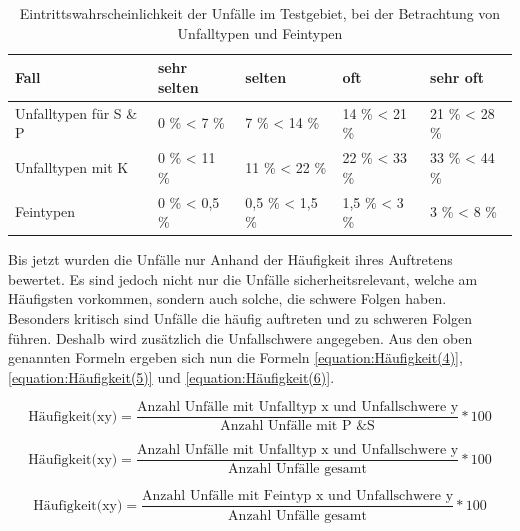 \begin{table}[htpb]
	\scriptsize
	\caption[Eintrittswahrscheinlichkeit der Unfälle im Testgebiet, bei der Betrachtung von Unfalltypen und Feintypen]{Eintrittswahrscheinlichkeit der Unfälle im Testgebiet, bei der Betrachtung von Unfalltypen und Feintypen}\label{tab:Haeufigkeits Bereiche}
	\centering
		\begin{tabular}{p{2cm} l l l l}
			\toprule
			Fall & sehr selten & selten & oft & sehr oft \\
			\midrule
			Unfalltypen für S \& P & 0 \% < 7 \%  & 7 \% < 14 \% & 14 \% < 21 \% & 21 \% < 28 \%\\
			Unfalltypen mit K & 0 \% < 11 \%  & 11 \% < 22 \% & 22 \% < 33 \% & 33 \% < 44 \%\\
			Feintypen & 0 \% < 0,5 \% & 0,5 \% < 1,5 \% & 1,5 \% < 3 \% & 3 \% < 8 \%\\
			\bottomrule
		\end{tabular}
\end{table}

Bis jetzt wurden die Unfälle nur Anhand der Häufigkeit ihres Auftretens bewertet. Es sind jedoch nicht nur die Unfälle sicherheitsrelevant, welche am Häufigsten vorkommen, sondern auch solche, die schwere Folgen haben. Besonders kritisch sind Unfälle die häufig auftreten und zu schweren Folgen führen. Deshalb wird zusätzlich die Unfallschwere angegeben. Aus den oben genannten Formeln ergeben sich nun die Formeln \ref{equation:Häufigkeit(4)}, \ref{equation:Häufigkeit(5)} und \ref{equation:Häufigkeit(6)}.

\begin{equation}\label{equation:Häufigkeit(4)}
\text{Häufigkeit(xy)} = \dfrac{\text{Anzahl Unfälle mit Unfalltyp x und Unfallschwere y}}{\text{Anzahl Unfälle mit P \& S}}*100
\end{equation}

\begin{equation}\label{equation:Häufigkeit(5)}
\text{Häufigkeit(xy)} = \dfrac{\text{Anzahl Unfälle mit Unfalltyp x und Unfallschwere y}}{\text{Anzahl Unfälle gesamt}}*100
\end{equation}

\begin{equation}\label{equation:Häufigkeit(6)}
\text{Häufigkeit(xy)} = \dfrac{\text{Anzahl Unfälle mit Feintyp x und Unfallschwere y}}{\text{Anzahl Unfälle gesamt}}*100
\end{equation}


